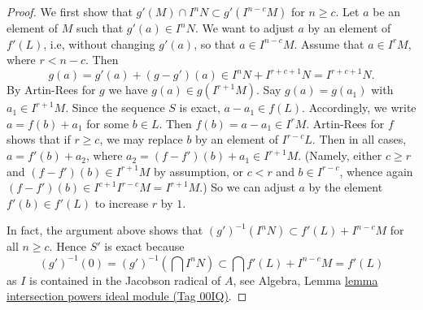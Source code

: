 \documentclass{amsart}
\theoremstyle{plain}
\theoremstyle{definition}
\theoremstyle{remark}
\numberwithin{equation}{subsection}
\begin{document}
\begin{proof}
We first show that $g'(M) \cap I^nN \subset g'(I^{n - c}M)$ for $n \geq c$.
Let $a$ be an element of $M$ such that $g'(a) \in I^nN$. We want to
adjust $a$ by an element of $f'(L)$, i.e, without changing $g'(a)$, so
that $a \in I^{n-c}M$. Assume that $a \in I^rM$, where $r < n - c$.
Then
$$
g(a) = g'(a) + (g - g')(a) \in
I^n N + I^{r + c + 1}N = I^{r + c + 1}N.
$$
By Artin-Rees for $g$ we have $g(a) \in g(I^{r + 1}M)$. Say $g(a) = g(a_1)$
with $a_1 \in I^{r + 1}M$. Since the sequence $S$ is exact, $a - a_1 \in f(L)$.
Accordingly, we write $a = f(b) + a_1$ for some $b \in L$.
Then $f(b) = a - a_1 \in I^rM$. Artin-Rees for $f$ shows that
if $r \geq c$, we may replace $b$ by an element of $I^{r - c}L$.
Then in all cases, $a = f'(b) + a_2$, where
$a_2 = (f - f')(b) + a_1 \in I^{r + 1}M$. (Namely, either $c \geq r$
and $(f - f')(b) \in I^{r + 1}M$ by assumption, or $c < r$ and
$b \in I^{r - c}$, whence again $(f - f')(b) \in I^{c + 1} I^{r - c} M =
I^{r + 1}M$.) So we can adjust $a$ by the element $f'(b) \in f'(L)$ to
increase $r$ by $1$.

\medskip\noindent
In fact, the argument above shows that
$(g')^{-1}(I^nN) \subset f'(L) + I^{n - c}M$ for all $n \geq c$.
Hence $S'$ is exact because
$$
(g')^{-1}(0) = (g')^{-1}(\bigcap I^nN) \subset
\bigcap f'(L) + I^{n - c}M = f'(L)
$$
as $I$ is contained in the Jacobson radical of $A$, see Algebra, Lemma
\href{https://stacks.math.columbia.edu/tag/00IQ}{lemma intersection powers ideal module (Tag 00IQ)}.
\end{proof}
\end{document}
